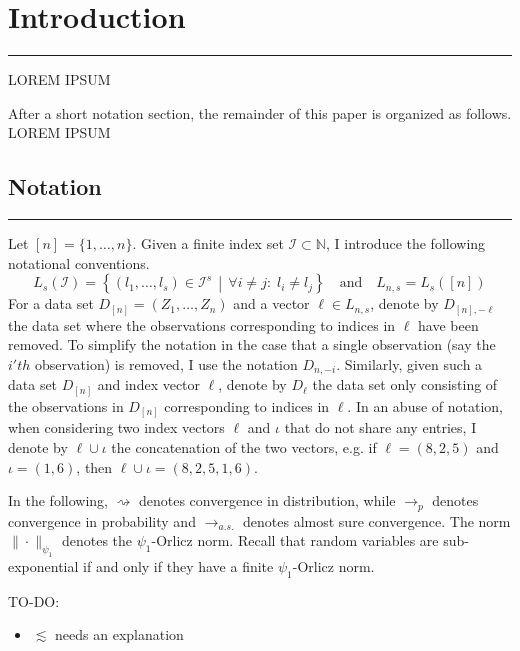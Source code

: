 \section{Introduction}
\hrule
	{\color{red} LOREM IPSUM}

After a short notation section, the remainder of this paper is organized as follows.
{\color{red} LOREM IPSUM}

\subsection{Notation}
\hrule
Let $[n] = \{1, \dotsc, n\}$.
Given a finite index set $\mathcal{I} \subset \mathbb{N}$, I introduce the following notational conventions.
\begin{equation}
	L_{s}(\mathcal{I}) = \left\{\left(l_1, \dotsc, l_s\right) \in \mathcal{I}^{s} \, \middle| \, \forall i \neq j: \; l_i \neq l_j\right\}
	\quad \text{and} \quad
	L_{n,s} = L_s\left([n]\right)
\end{equation}
For a data set $D_{[n]} = \left(Z_1, \dotsc, Z_{n}\right)$ and a vector $\ell \in L_{n,s}$, denote by $D_{[n], -\ell}$ the data set where the observations corresponding to indices in $\ell$ have been removed.
To simplify the notation in the case that a single observation (say the $i'th$ observation) is removed, I use the notation $D_{n, -i}$.
Similarly, given such a data set $D_{[n]}$ and index vector $\ell$, denote by $D_{\ell}$ the data set only consisting of the observations in $D_{[n]}$ corresponding to indices in $\ell$.
In an abuse of notation, when considering two index vectors $\ell$ and $\iota$ that do not share any entries, I denote by $\ell \cup \iota$ the concatenation of the two vectors, e.g. if $\ell = (8,2,5)$ and $\iota = (1,6)$, then $\ell \cup \iota = (8,2,5,1,6)$.

In the following, $\rightsquigarrow$ denotes convergence in distribution, while $\rightarrow_{p}$ denotes convergence in probability and $\rightarrow_{a.s.}$ denotes almost sure convergence.
The norm $\| \cdot \|_{\psi_1}$ denotes the $\psi_1$-Orlicz norm.
Recall that random variables are sub-exponential if and only if they have a finite $\psi_1$-Orlicz norm.

{\color{red} TO-DO:}
\begin{itemize}
	\item $\lesssim$ needs an explanation
\end{itemize}